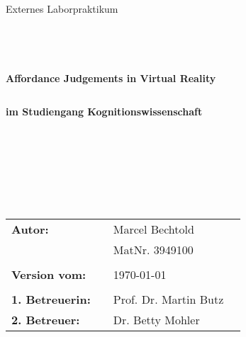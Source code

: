 \begin{center}
\Large{Externes Laborpraktikum}
\end{center}
\begin{verbatim}




\end{verbatim}
\begin{center}
\doublespacing
\textbf{\LARGE{Affordance Judgements in Virtual Reality}}\\
\singlespacing
\begin{verbatim}

\end{verbatim}
\textbf{im Studiengang Kognitionswissenschaft}
\end{center}
\begin{verbatim}

\end{verbatim}
\begin{center}

\end{center}
\begin{verbatim}

\end{verbatim}
\begin{center}
\textbf{}
\end{center}
\begin{verbatim}






\end{verbatim}
\begin{flushleft}
\begin{tabular}{llll}
\textbf{Autor:} & & Marcel Bechtold& \\
& & MatNr. 3949100 & \\
& & \\
\textbf{Version vom:} & & \today &\\
& & \\
\textbf{1. Betreuerin:} & & Prof. Dr. Martin Butz &\\
\textbf{2. Betreuer:} & & Dr. Betty Mohler &\\
\end{tabular}
\end{flushleft}